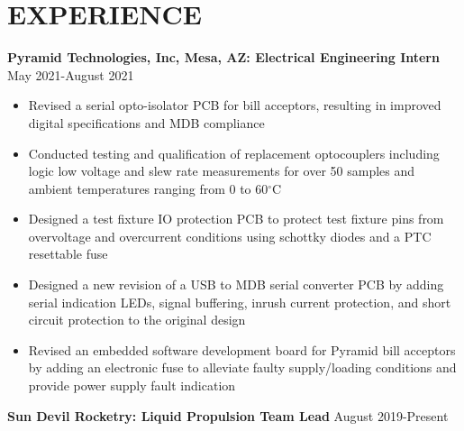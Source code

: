 \documentclass{article}
\begin{document}
\section{EXPERIENCE}
\textbf{Pyramid Technologies, Inc, Mesa, AZ: Electrical Engineering Intern}
\hfill 
\vspace{0.5em}
May 2021-August 2021
\begin{itemize}
\item{Revised a serial opto-isolator PCB for bill acceptors, resulting in improved digital specifications and MDB compliance}
\item{Conducted testing and qualification of replacement optocouplers including logic low voltage and slew rate measurements for over 50 samples and ambient temperatures ranging from 0 to 60$^{\circ}$C}
\item{Designed a test fixture IO protection PCB to protect test fixture pins from overvoltage and overcurrent conditions using schottky diodes and a PTC resettable fuse}
\item{Designed a new revision of a USB to MDB serial converter PCB by adding serial indication LEDs, signal buffering, inrush current protection, and short circuit protection to the original design}
\item{Revised an embedded software development board for Pyramid bill acceptors by adding an electronic fuse to alleviate faulty supply/loading conditions and provide power supply fault indication}
\end{itemize}
\vspace{0.5em}
\textbf{Sun Devil Rocketry: Liquid Propulsion Team Lead}
\hfill
\vspace{0.5em}
August 2019-Present
\end{document}
